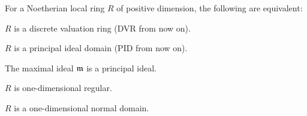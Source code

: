 \documentclass[a4paper,parskip=half,numbers=enddot, DIV=12]{scrreprt}
\begin{document}
\begin{thm}
    For a Noetherian local ring $R$ of positive dimension, the following are equivalent:
    \begin{alphanumerate}
    \item 
        $R$ is a discrete valuation ring (DVR from now on).
    \item 
        $R$ is a principal ideal domain (PID from now on).
    \item 
        The maximal ideal $\mathfrak{m}$ is a principal ideal.
    \item 
        $R$ is one-dimensional regular.
    \item 
        $R$ is a one-dimensional normal domain.
    \end{alphanumerate}
\end{thm}
\end{document}
